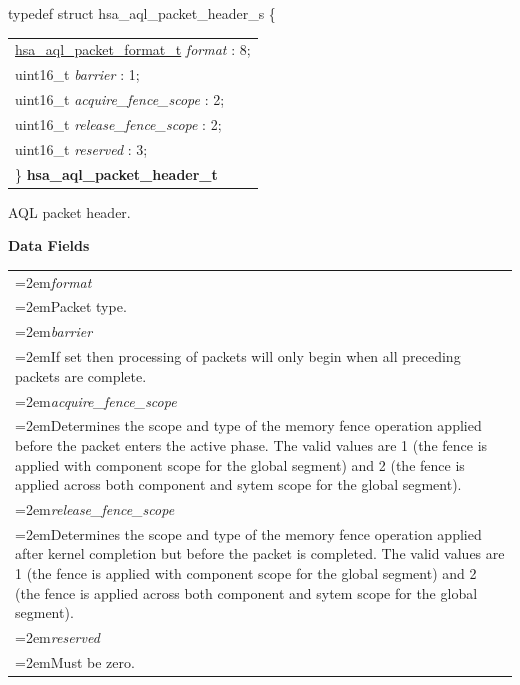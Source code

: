\documentclass[final]{book}
\newcommand{\reffld}[1]{\textit{#1}}
\begin{document}
\begin{appendices}
\noindent\begin{tcolorbox}[breakable,nobeforeafter,arc=0mm,colframe=white,colback=lightgray,left=0mm]
typedef struct  hsa_aql_packet_header_s \{
\vspace{-3.5mm}\begin{longtable}{@{}p{\textwidth}}
\hspace{1.7em}\hyperlink{group--aql-1ga21e03ac6edb26e457468af5fe501b7ad}{hsa_aql_packet_format_t} \reffld{format} : 8;\\
\hspace{1.7em}uint16_t \reffld{barrier} : 1;\\
\hspace{1.7em}uint16_t \reffld{acquire_fence_scope} : 2;\\
\hspace{1.7em}uint16_t \reffld{release_fence_scope} : 2;\\
\hspace{1.7em}uint16_t \reffld{reserved} : 3;\\
\}  \hypertarget{group--aql-1ga92558e047d003985bae2558febd3dd40}{\textbf{hsa_aql_packet_header_t}}
\end{longtable}

\end{tcolorbox}
AQL packet header.

\noindent\textbf{Data Fields}\\[-6mm]
\begin{longtable}{@{}>{\hangindent=2em}p{\textwidth}}
\reffld{format}\\\hspace{2em}Packet type.\\[2mm]
\reffld{barrier}\\\hspace{2em}If set then processing of packets will only begin when all preceding packets are complete.\\[2mm]
\reffld{acquire_fence_scope}\\\hspace{2em}Determines the scope and type of the memory fence operation applied before the packet enters the active phase. The valid values are 1 (the fence is applied with component scope for the global segment) and 2 (the fence is applied across both component and sytem scope for the global segment).\\[2mm]
\reffld{release_fence_scope}\\\hspace{2em}Determines the scope and type of the memory fence operation applied after kernel completion but before the packet is completed. The valid values are 1 (the fence is applied with component scope for the global segment) and 2 (the fence is applied across both component and sytem scope for the global segment).\\[2mm]
\reffld{reserved}\\\hspace{2em}Must be zero.
\end{longtable}




\end{appendices}
\end{document}

